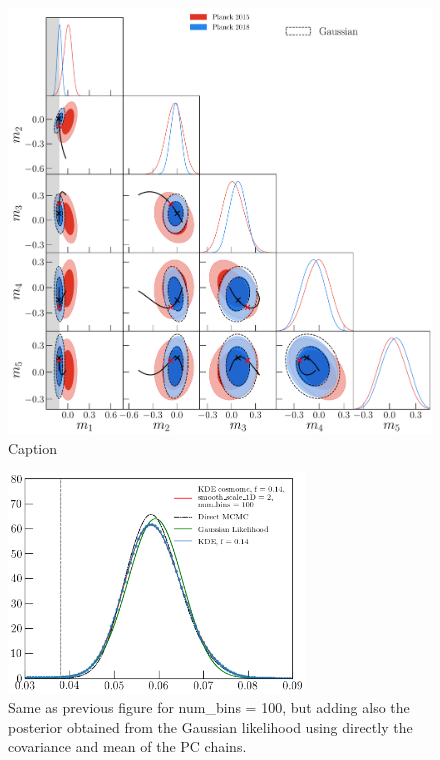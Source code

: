 \documentclass[prd,amsmath,amssymb,floatfix,superscriptaddress,nofootinbib]{revtex4-1}
\begin{document}
\begin{figure}
    \centering
    \includegraphics[width=1.0\textwidth]{paper/plots/plot_mj_triangle_t18_r12_t19_t20_vs_pl18_pc_zmax30_pliklite_srollv2_1015_wTauTrajectory_pl15_wTanhML_wGaussEllipse.pdf}
    \caption{Caption}
    \label{fig:plot_triangle_wGauss}
\end{figure}




\begin{figure}
\includegraphics[width=0.7\textwidth]{ cosmomc_kde/pl18_relike_tanh_tau_dz0p5_oversampled_1D_smooth_scale_1D_2_num_bins_1D_100_post_bug_fix_wGauss.png}
\caption{Same as previous figure for num\_bins = 100, but adding also the posterior obtained from the Gaussian likelihood using directly the covariance and mean of the PC chains.
}
\label{fig:}
\end{figure}
\end{document}
